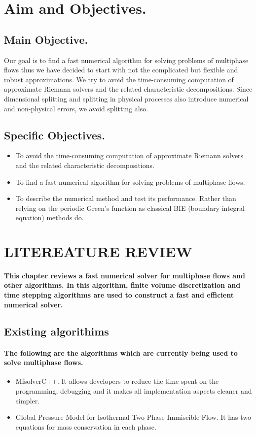 \documentclass[a4paper,12pt]{article}
\begin{document}
\section{Aim and Objectives.}
\subsection{Main Objective.}
Our goal is to find a fast numerical algorithm for solving problems of multiphase flows thus we have decided to start with not the complicated but flexible and robust approximations.
\newline We try to avoid the time-consuming computation of approximate Riemann solvers and the related characteristic decompositions. Since dimensional splitting and splitting in physical processes also introduce numerical and non-physical errors, we avoid splitting also. 
\subsection{Specific Objectives.}
\begin{itemize}
\item To avoid the time-consuming computation of approximate Riemann solvers and the related characteristic decompositions.
\item To find a fast numerical algorithm for solving problems of multiphase flows. 
\item To describe the numerical method and test its performance. Rather than relying on the periodic Green's function as classical BIE (boundary integral equation) methods do.
\end{itemize}
\section{LITEREATURE REVIEW}
\paragraph{This chapter reviews a fast numerical solver for multiphase flows and other algorithms. In this algorithm, finite volume discretization and time stepping algorithms are used to construct a fast and efficient numerical solver.}
\subsection{Existing algorithims}

\paragraph{
The following are the algorithms which are currently being used to solve multiphase flows.}
\begin{itemize}
\item{MfsolverC++. It allows developers to reduce the time spent on the programming, debugging and it makes all implementation aspects cleaner and simpler.}
\item{Global Pressure Model for Isothermal Two-Phase Immiscible Flow. It has two equations for mass conservation in each phase.}
\end{itemize}
\end{document}

